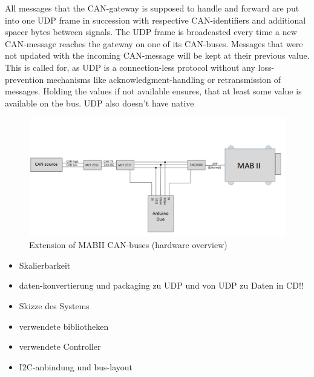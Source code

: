\documentclass[ExampleMasters.tex]{subfiles}
\begin{document}
All messages that the CAN-gateway is supposed to handle and forward are put into one UDP frame in succession with respective CAN-identifiers and additional spacer bytes between signals. The UDP frame is broadcasted every time a new CAN-message reaches the gateway on one of its CAN-buses. Messages that were not updated with the incoming CAN-message will be kept at their previous value. This is called for, as UDP is a connection-less protocol without any loss-prevention mechanisms like acknowledgment-handling or retransmission of messages. Holding the values if not available ensures, that at least some value is available on the bus. UDP also doesn't have native 





\begin{figure}[h]
\centering
\includegraphics[width=1\linewidth]{figures/can_extension}
\caption{Extension of MABII CAN-buses (hardware overview)}
\label{fig:can_extension}
\end{figure}


\begin{itemize}
	\item Skalierbarkeit
	\item daten-konvertierung und packaging zu UDP und von UDP zu Daten in CD!!
	\item Skizze des Systems
	\item verwendete bibliotheken
	\item verwendete Controller
	\item I2C-anbindung und bus-layout
\end{itemize}
\end{document}
